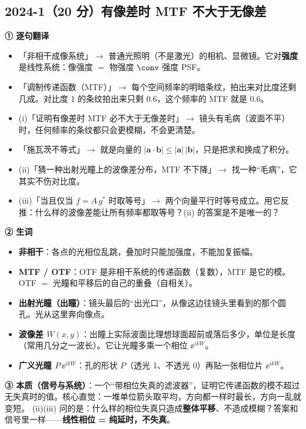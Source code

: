 \subsection{2024-1（20 分）有像差时 MTF 不大于无像差}\label{ex:2024-1}
\label{rd:2024-1}
\begin{idea}[读题：这道题在说什么]
\textbf{① 逐句翻译}
\begin{itemize}
\item 「非相干成像系统」$\to$ 普通光照明（不是激光）的相机、显微镜。它对\textbf{强度}是线性系统：像强度 $=$ 物强度 $\conv$ 强度 PSF。
\item 「调制传递函数（MTF）」$\to$ 每个空间频率的明暗条纹，拍出来对比度还剩几成。对比度 1 的条纹拍出来只剩 0.6，这个频率的 MTF 就是 0.6。
\item (i)「证明有像差时 MTF 必不大于无像差时」$\to$ 镜头有毛病（波面不平）时，任何频率的条纹都只会更模糊，不会更清楚。
\item 「施瓦茨不等式」$\to$ 就是向量的 $|\bm a\cdot\bm b|\le|\bm a|\,|\bm b|$，只是把求和换成了积分。
\item (ii)「猜一种出射光瞳上的波像差分布，MTF 不下降」$\to$ 找一种“毛病”，它其实不伤对比度。
\item (iii)「当且仅当 $f=A\,g^*$ 时取等号」$\to$ 两个向量平行时等号成立。用它反推：什么样的波像差能让所有频率都取等号？(ii) 的答案是不是唯一的？
\end{itemize}
\textbf{② 生词}
\begin{itemize}
\item \textbf{非相干}：各点的光相位乱跳，叠加时只能加强度，不能加复振幅。
\item \textbf{MTF / OTF}：OTF 是非相干系统的传递函数（复数），MTF 是它的模。OTF $=$ 光瞳和平移后的自己的重叠（自相关）。
\item \textbf{出射光瞳（出瞳）}：镜头最后的“出光口”，从像这边往镜头里看到的那个圆孔。光从这里奔向像点。
\item \textbf{波像差 $W(x,y)$}：出瞳上实际波面比理想球面超前或落后多少，单位是长度（常用几分之一波长）。它让光瞳多乘一个相位 $\ee^{ikW}$。
\item \textbf{广义光瞳 $P\,\ee^{ikW}$}：孔的形状 $P$（透光 1、不透光 0）再贴一张相位片 $\ee^{ikW}$。
\end{itemize}
\textbf{③ 本质（信号与系统）}：一个“带相位失真的滤波器”，证明它传递函数的模不超过无失真时的值。核心直觉：一堆单位箭头取平均，方向都一样时最长，方向一乱就变短。
(ii)(iii) 问的是：什么样的相位失真只造成\textbf{整体平移}、不造成模糊？答案和信号里一样——\textbf{线性相位 = 纯延时，不失真}。


\end{idea}
